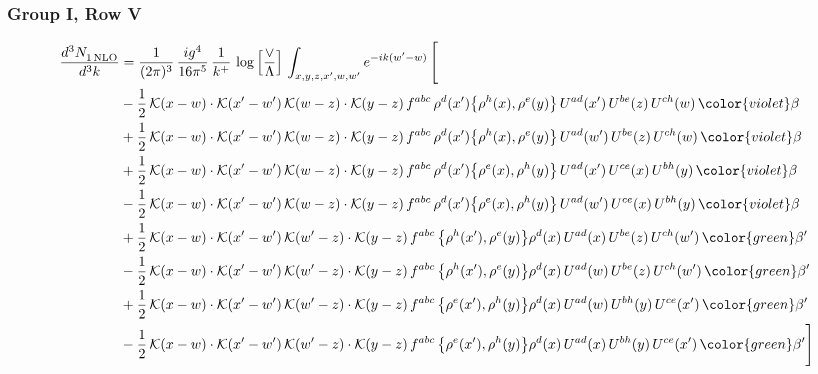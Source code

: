 \subsubsection{Group I, Row V}
\begin{align}
    \frac{d^{3}N_{1\,\rm NLO}^{\rm}}{d^{3}k}  & = \frac{1}{(2\pi)^{3}}\, \frac{ig^{4}}{16\pi^{5}}\, \frac{1}{k^{+}}\, \log{\left[\frac{\vee}{\Lambda}\right]}\, \int_{x,y,z,x^{\prime},w,w^{\prime}}e^{-ik(w^{\prime}-w)}\, \Bigg[\notag \\ & -\frac{1}{2}\,\mathcal{K}(x-w)\cdot\mathcal{K}(x'-w')\,\mathcal{K}(w-z)\cdot\mathcal{K}(y-z)\, f^{abc}\,\rho^{d}(x')\big\{\rho^{h}(x),\rho^{e}(y)\big\}\,U^{ad}(x')\,U^{be}(z)\,U^{ch}(w)\,{\color{violet} \beta}\notag\\ & +\frac{1}{2}\,\mathcal{K}(x-w)\cdot\mathcal{K}(x'-w')\,\mathcal{K}(w-z)\cdot\mathcal{K}(y-z)\, f^{abc}\,\rho^{d}(x')\big\{\rho^{h}(x),\rho^{e}(y)\big\}\,U^{ad}(w')\,U^{be}(z)\,U^{ch}(w)\,{\color{violet} \beta}\notag\\ &+\frac{1}{2}\,\mathcal{K}(x-w)\cdot\mathcal{K}(x'-w')\,\mathcal{K}(w-z)\cdot\mathcal{K}(y-z)\, f^{abc}\,\rho^{d}(x')\big\{\rho^{e}(x),\rho^{h}(y)\big\}\,U^{ad}(x')\,U^{ce}(x)\,U^{bh}(y)\,{\color{violet} \beta}\notag\\ & -\frac{1}{2}\,\mathcal{K}(x-w)\cdot\mathcal{K}(x'-w')\,\mathcal{K}(w-z)\cdot\mathcal{K}(y-z)\, f^{abc}\,\rho^{d}(x')\big\{\rho^{e}(x),\rho^{h}(y)\big\}\,U^{ad}(w')\,U^{ce}(x)\,U^{bh}(y)\,{\color{violet} \beta}\notag\\ & +\frac{1}{2}\,\mathcal{K}(x-w)\cdot\mathcal{K}(x'-w')\,\mathcal{K}(w'-z)\cdot\mathcal{K}(y-z)\, f^{abc}\,\big\{\rho^{h}(x'),\rho^{e}(y)\big\}\rho^{d}(x)\,U^{ad}(x)\,U^{be}(z)\,U^{ch}(w')\,{\color{green} \beta'}\notag\\ &-\frac{1}{2}\,\mathcal{K}(x-w)\cdot\mathcal{K}(x'-w')\,\mathcal{K}(w'-z)\cdot\mathcal{K}(y-z)\, f^{abc}\,\big\{\rho^{h}(x'),\rho^{e}(y)\big\}\rho^{d}(x)\,U^{ad}(w)\,U^{be}(z)\,U^{ch}(w')\,{\color{green} \beta'}\notag\\ & +\frac{1}{2}\,\mathcal{K}(x-w)\cdot\mathcal{K}(x'-w')\,\mathcal{K}(w'-z)\cdot\mathcal{K}(y-z)\, f^{abc}\,\big\{\rho^{e}(x'),\rho^{h}(y)\big\}\rho^{d}(x)\,U^{ad}(w)\,U^{bh}(y)\,U^{ce}(x')\,{\color{green} \beta'}\notag\\ &-\frac{1}{2}\,\mathcal{K}(x-w)\cdot\mathcal{K}(x'-w')\,\mathcal{K}(w'-z)\cdot\mathcal{K}(y-z)\, f^{abc}\,\big\{\rho^{e}(x'),\rho^{h}(y)\big\}\rho^{d}(x)\,U^{ad}(x)\,U^{bh}(y)\,U^{ce}(x')\,{\color{green} \beta'} \Bigg]
\end{align}
